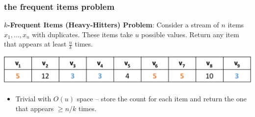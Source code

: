 \documentclass[]{beamer}
\begin{document}
	\begin{frame}
		\frametitle{the frequent items problem}
		\small
		\textbf{$k$-Frequent Items (Heavy-Hitters) Problem}: Consider a stream of $n$ items $x_1,\ldots, x_n$ with duplicates. These items take $u$ possible values. Return any item that appears at least $\frac{n}{k}$ times.
		\begin{center}
			\includegraphics[width=.95\textwidth]{fi.png}
		\end{center}
		\vspace{-.5em}
		\begin{itemize}
			\vspace{.5em}
			\item Trivial with $O(u)$ space -- store the count for each item and return the one that appears $\ge n/k$ times.
		\end{itemize}
		
	\end{frame}
	
\end{document}
